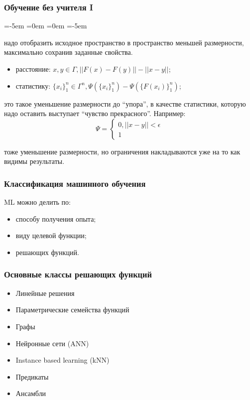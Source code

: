 \documentclass[14pt, fleqn, xcolor={dvipsnames, table}]{beamer}
\newcommand\indentdisplays[1]{%
     \everydisplay{\addtolength\displayindent{#1}%
     \addtolength\displaywidth{-#1}}}
\begin{document}
\begin{frame}[t]\frametitle{Обучение без учителя I}
\begin{description}
	\leftmargin=-5em
	\itemindent=0em
	=0em
	\leftskip=-5em
	\item[Уменьшение размерности:] надо отобразить исходное пространство в пространство меньшей размерности, максимально сохранив заданные свойства.
	\begin{itemize}
	\leftskip=-5em \small
		\item расстояние: $x,y \in \Gamma, ||F(x) - F(y)|| - ||x - y||$;
		\item статистику: $\{x_i\}_1^n \in \Gamma^n, \Psi(\{x_i\}_1^n) - \Psi(\{F(x_i)\}^n_1)$;
	\end{itemize}
	\item[Кластеризация:] это такое уменьшение размерности до ``упора'', в качестве статистики, которую надо оставить выступает ``чувство прекрасного''. Например: {\indentdisplays{-5em} \small $$
	\Psi = \left\{\begin{array}{l}0, ||x - y|| < \epsilon\\1\end{array}\right.
	$$}
	\item[Обучение представлению] тоже уменьшение размерности, но ограничения накладываются уже на то как видимы результаты.
\end{description}
\end{frame}

\begin{frame}
\frametitle{Классификация машинного обучения}
ML можно делить по:
\begin{itemize}
	\item способу получения опыта;
	\item виду целевой функции;
	\item { решающих функций.}
\end{itemize}
\end{frame}

\begin{frame}
\frametitle{Основные классы решающих функций}
\begin{itemize}
\item Линейные решения
\item Параметрические семейства функций
\item Графы
\item Нейронные сети (ANN)
\item Instance based learning (kNN)
\item Предикаты
\item Ансамбли
\end{itemize}
\end{frame}
\end{document}

